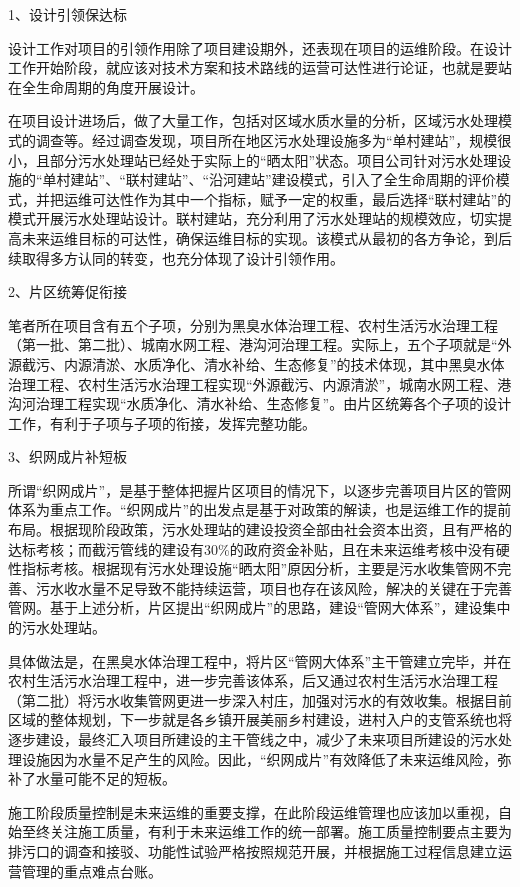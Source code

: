 \documentclass[
]{book}
\begin{document}
1、设计引领保达标

设计工作对项目的引领作用除了项目建设期外，还表现在项目的运维阶段。在设计工作开始阶段，就应该对技术方案和技术路线的运营可达性进行论证，也就是要站在全生命周期的角度开展设计。

在项目设计进场后，做了大量工作，包括对区域水质水量的分析，区域污水处理模式的调查等。经过调查发现，项目所在地区污水处理设施多为``单村建站''，规模很小，且部分污水处理站已经处于实际上的``晒太阳''状态。项目公司针对污水处理设施的``单村建站''、``联村建站''、``沿河建站''建设模式，引入了全生命周期的评价模式，并把运维可达性作为其中一个指标，赋予一定的权重，最后选择``联村建站''的模式开展污水处理站设计。联村建站，充分利用了污水处理站的规模效应，切实提高未来运维目标的可达性，确保运维目标的实现。该模式从最初的各方争论，到后续取得多方认同的转变，也充分体现了设计引领作用。

2、片区统筹促衔接

笔者所在项目含有五个子项，分别为黑臭水体治理工程、农村生活污水治理工程（第一批、第二批）、城南水网工程、港沟河治理工程。实际上，五个子项就是``外源截污、内源清淤、水质净化、清水补给、生态修复''的技术体现，其中黑臭水体治理工程、农村生活污水治理工程实现``外源截污、内源清淤''，城南水网工程、港沟河治理工程实现``水质净化、清水补给、生态修复''。由片区统筹各个子项的设计工作，有利于子项与子项的衔接，发挥完整功能。

3、织网成片补短板

所谓``织网成片''，是基于整体把握片区项目的情况下，以逐步完善项目片区的管网体系为重点工作。``织网成片''的出发点是基于对政策的解读，也是运维工作的提前布局。根据现阶段政策，污水处理站的建设投资全部由社会资本出资，且有严格的达标考核；而截污管线的建设有30\%的政府资金补贴，且在未来运维考核中没有硬性指标考核。根据现有污水处理设施``晒太阳''原因分析，主要是污水收集管网不完善、污水收水量不足导致不能持续运营，项目也存在该风险，解决的关键在于完善管网。基于上述分析，片区提出``织网成片''的思路，建设``管网大体系''，建设集中的污水处理站。

具体做法是，在黑臭水体治理工程中，将片区``管网大体系''主干管建立完毕，并在农村生活污水治理工程中，进一步完善该体系，后又通过农村生活污水治理工程（第二批）将污水收集管网更进一步深入村庄，加强对污水的有效收集。根据目前区域的整体规划，下一步就是各乡镇开展美丽乡村建设，进村入户的支管系统也将逐步建设，最终汇入项目所建设的主干管线之中，减少了未来项目所建设的污水处理设施因为水量不足产生的风险。因此，``织网成片''有效降低了未来运维风险，弥补了水量可能不足的短板。

施工阶段质量控制是未来运维的重要支撑，在此阶段运维管理也应该加以重视，自始至终关注施工质量，有利于未来运维工作的统一部署。施工质量控制要点主要为排污口的调查和接驳、功能性试验严格按照规范开展，并根据施工过程信息建立运营管理的重点难点台账。
\end{document}
